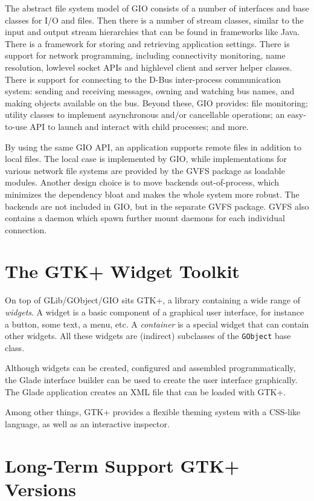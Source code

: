 \documentclass[a4paper,notumble]{leaflet}
\begin{document}
The abstract file system model of GIO consists of a number of interfaces and base classes for I/O and files. Then there is a number of stream classes, similar to the input and output stream hierarchies that can be found in frameworks like Java. There is a framework for storing and retrieving application settings. There is support for network programming, including connectivity monitoring, name resolution, lowlevel socket APIs and highlevel client and server helper classes. There is support for connecting to the D-Bus inter-process communication system: sending and receiving messages, owning and watching bus names, and making objects available on the bus. Beyond these, GIO provides: file monitoring; utility classes to implement asynchronous and/or cancellable operations; an easy-to-use API to launch and interact with child processes; and more.

By using the same GIO API, an application supports remote files in addition to local files. The local case is implemented by GIO, while implementations for various network file systems are provided by the GVFS package as loadable modules. Another design choice is to move backends out-of-process, which minimizes the dependency bloat and makes the whole system more robust. The backends are not included in GIO, but in the separate GVFS package. GVFS also contains a daemon which spawn further mount daemons for each individual connection.

\pagebreak
\section{The GTK+ Widget Toolkit}

On top of GLib/GObject/GIO sits GTK+, a library containing a wide range of \textit{widgets}. A widget is a basic component of a graphical user interface, for instance a button, some text, a menu, etc. A \textit{container} is a special widget that can contain other widgets. All these widgets are (indirect) subclasses of the \texttt{GObject} base class.

Although widgets can be created, configured and assembled programmatically, the Glade interface builder can be used to create the user interface graphically. The Glade application creates an XML file that can be loaded with GTK+.

Among other things, GTK+ provides a flexible theming system with a CSS-like language, as well as an interactive inspector.

\section{Long-Term Support GTK+ Versions}
\end{document}
